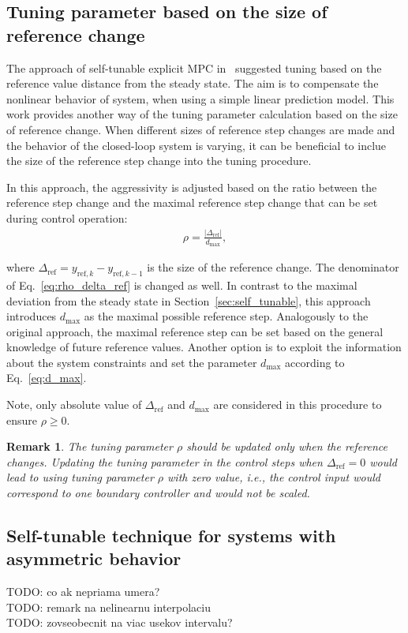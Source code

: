 \documentclass[preprint,12pt]{elsarticle}
\newtheorem{remark}[theorem]{Remark}
\begin{document}
\subsection{Tuning parameter based on the size of reference change}
\label{sec:self_tunable_delta_ref}
The approach of self-tunable explicit MPC in~\cite{self_tunable} suggested tuning based on the reference value distance from the steady state. The aim is to compensate the nonlinear behavior of system, when using a simple linear prediction model. This work provides another way of the tuning parameter calculation based on the size of reference change. When different sizes of reference step changes are made and the behavior of the closed-loop system is varying, it can be beneficial to inclue the size of the reference step change into the tuning procedure.

In this approach, the aggressivity is adjusted based on the ratio between the reference step change and the maximal reference step change that can be set during control operation:
\begin{eqnarray}
	\label{eq:rho_delta_ref}
	\rho = \frac{\vert \Delta_{\mathrm{ref}} \vert}{d_{\max}},
\end{eqnarray} 

where $\Delta_{\mathrm{ref}} = y_{\mathrm{ref},k}-y_{\mathrm{ref},k-1}$ is the size of the reference change. The denominator of Eq.~\eqref{eq:rho_delta_ref} is changed as well. In contrast to the maximal deviation from the steady state in Section~\ref{sec:self_tunable}, this approach introduces $d_{\max}$ as the maximal possible reference step. 
Analogously to the original approach, the maximal reference step can be set based on the general knowledge of future reference values. Another option is to exploit the information about the system constraints and set the parameter $d_{\max}$ according to Eq.~\eqref{eq:d_max}. 
 
Note, only absolute value of $\Delta_{\mathrm{ref}}$ and $d_{\max}$ are considered in this procedure to ensure $\rho \ge 0$. 

\begin{remark}
	The tuning parameter $\rho$ should be updated only when the reference changes. Updating the tuning parameter in the control steps when $\Delta_{\mathrm{ref}} = 0$ would lead to using tuning parameter $\rho$ with zero value, i.e., the control input would correspond to one boundary controller and would not be scaled.
\end{remark}


\subsection{Self-tunable technique for systems with asymmetric behavior}
\label{sec:self_tunable_rho_scaling}
\noindent TODO: co ak nepriama umera? \\
TODO: remark na nelinearnu interpolaciu \\
TODO: zovseobecnit na viac usekov intervalu? \\
\end{document}
